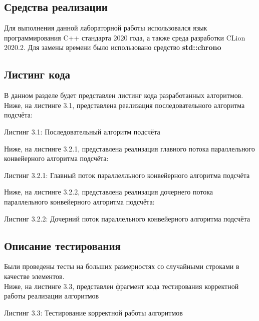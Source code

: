 \documentclass[12pt,a4paper]{article}
\numberwithin{equation}{section}
\begin{document}
\subsection{Средства реализации}
\qquad Для выполнения данной лабораторной работы использовался язык программирования C++ стандарта 2020 года, а также среда разработки CLion 2020.2. Для замены времени было использовано средство \textbf{std::chrono} \cite{litlink4}
\subsection{Листинг кода}
\qquad В данном разделе будет представлен листинг кода разработанных алгоритмов.\\

Ниже, на листинге 3.1, представлена реализация последовательного алгоритма подсчёта:
\begin{center}
	Листинг 3.1: Последовательный алгоритм подсчёта
	
\end{center}
\clearpage

Ниже, на листинге 3.2.1, представлена реализация главного потока параллельного конвейерного алгоритма подсчёта:
\begin{center}
	Листинг 3.2.1: Главный поток параллелльного конвейерного алгоритма подсчёта
	
\end{center}

Ниже, на листинге 3.2.2, представлена реализация дочернего потока параллельного конвейерного алгоритма подсчёта:
\begin{center}
	Листинг 3.2.2: Дочерний поток параллельного конвейерного алгоритма подсчёта
	
\end{center}
\clearpage


\subsection{Описание тестирования} %
Были проведены тесты на больших размерностях со случайными строками в качестве элементов.\\
Ниже, на листинге 3.3, представлен фрагмент кода тестирования корректной работы реализации алгоритмов
\begin{center}
	Листинг 3.3: Тестирование корректной работы алгоритмов
		
\end{center}
\end{document}
